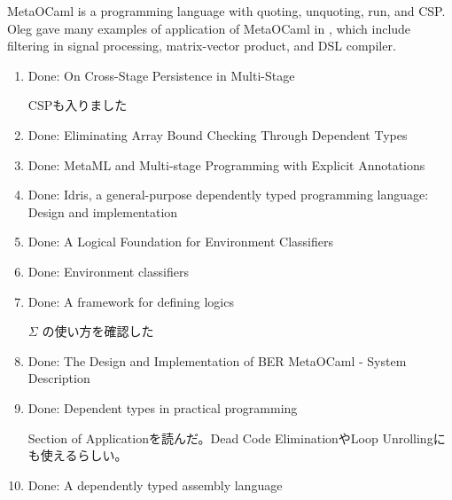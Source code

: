 \documentclass[runningheads]{llncs}
\begin{document}
									
									MetaOCaml is a programming language with quoting, unquoting, run, and CSP.
									Oleg gave many examples of application of MetaOCaml in \cite{8384206}, 
									which include filtering in signal processing, matrix-vector product, and DSL compiler.
									
									\begin{enumerate}
										\item Done: On Cross-Stage Persistence in Multi-Stage\cite{Hanada2014}
										      	      
										      CSPも入りました
										\item Done: Eliminating Array Bound Checking Through Dependent Types\cite{Xi98}
										\item Done: MetaML and Multi-stage Programming with Explicit Annotations\cite{MetaML}
										\item Done: Idris, a general-purpose dependently typed programming language: Design and implementation\cite{brady2013idris}
										\item Done: A Logical Foundation for Environment Classifiers\cite{Tsukada}
										\item Done: Environment classifiers\cite{taha2003environment}
										\item Done: A framework for defining logics\cite{harper1993framework}
										      	      
										      $\Sigma$ の使い方を確認した
										\item Done: The Design and Implementation of {BER} MetaOCaml - System Description\cite{oleg2014}
										\item Done: Dependent types in practical programming\cite{xi1999dependent}
										      	      
										      Section of Applicationを読んだ。Dead Code EliminationやLoop Unrollingにも使えるらしい。
										      	      
										\item Done: A dependently typed assembly language\cite{xi2001dependently}
										      	      

\end{enumerate}
\end{document}
